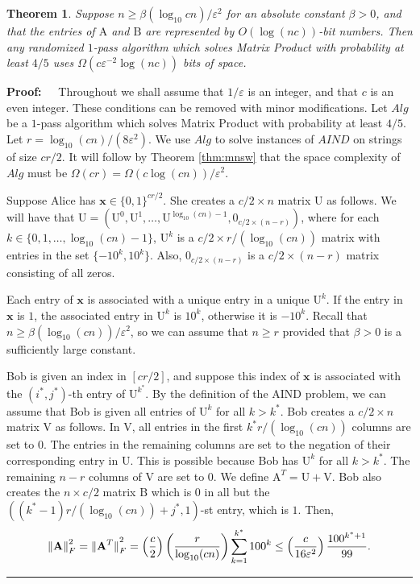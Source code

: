 \documentclass[11pt]{article}
\newtheorem{theorem}{Theorem}
\newenvironment{proof}{\begin{trivlist} \item {\bf Proof:~~}}
  {\qed\end{trivlist}}
\newcommand{\mat}[1]{{\ensuremath{\bm{\mathrm{#1}}}}}
\def\matA{\mat{A}}
\def\matB{\mat{B}}
\def\matU{\mat{U}}
\def\matV{\mat{V}}
\def\frac#1#2{{#1\over #2}}
\def\qed{\hfill\rule{2mm}{2mm}}
\def\x{{\mathbf x}}
\newcommand{\normF}[1]{{\| #1 \|}_F}
\newcommand{\eps}{\varepsilon}
\begin{document}
\begin{theorem}
Suppose $n \geq \beta (\log_{10} cn)/\varepsilon^2$ for an absolute constant $\beta > 0$, and
that the entries of $\matA$ and $\matB$ are represented by $O(\log (nc))$-bit numbers.
Then any randomized $1$-pass algorithm which solves Matrix Product with probability 
at least $4/5$ uses $\Omega(c\varepsilon^{-2}\log (nc))$ bits of space.
\end{theorem}
\begin{proof}
Throughout we shall assume that $1/\eps$ is an integer, and that
$c$ is an even integer. These conditions can be removed with minor modifications.
Let $Alg$ be a $1$-pass algorithm which solves Matrix Product with 
probability at least $4/5$. Let $r = \log_{10} (cn)/(8\varepsilon^2)$. We 
use $Alg$ to solve instances of $AIND$ on strings of size $cr/2$. It will 
follow by Theorem \ref{thm:mnsw} that the space complexity of $Alg$ must be 
$\Omega(cr) = \Omega(c\log (cn))/\eps^2$. 

Suppose Alice has $\x \in \{0,1\}^{cr/2}$. 
She creates a $c/2 \times n$ matrix $\matU$ as follows. We will have that
$\matU = (\matU^0, \matU^1, \ldots, \matU^{\log_{10}(cn) - 1}, \mat0_{c/2 \times (n-r)})$, where for each 
$k \in \{0, 1, \ldots, \log_{10} (cn)-1\}$, $\matU^k$ is a 
$c/2 \times r/(\log_{10} (cn))$ matrix with entries in the set $\{-10^k, 10^k\}$.
Also, $\mat0_{c/2 \times (n-r)}$ is a $c/2 \times (n-r)$ matrix consisting of all zeros.

Each entry of $\x$ is associated with a unique entry in a unique $\matU^k$. If the
entry in $\x$ is $1$, the associated entry in $\matU^k$ is $10^k$, otherwise it is
$-10^k$. Recall that $n \geq \beta (\log_{10}(cn))/\eps^2$, so we can assume 
that $n \geq r$ provided that $\beta > 0$ is a sufficiently large constant.

Bob is given an index in $[cr/2]$, and suppose this index of $\x$ is associated
with the $(i^*, j^*)$-th entry of $\matU^{k^*}$. By the definition of the AIND problem,
we can assume that Bob is given all entries of $\matU^k$ for all $k > k^*$.
Bob creates a $c/2 \times n$ matrix $\matV$ as follows. In $\matV$, all entries in the first
$k^*r/(\log_{10} (cn))$ columns are set to $0$. The entries in the remaining columns
are set to the negation of their corresponding entry in $\matU$. This is possible 
because Bob has $\matU^k$ for all $k > k^*$. 
The remaining $n - r$ columns of 
$\matV$ are set to $0$. We define $\matA^T = \matU + \matV$. Bob also creates the 
$n \times c/2$ matrix $\matB$ which is $0$ in all but the 
$((k^*-1)r/(\log_{10} (cn)) + j^*,1)$-st entry, which is $1$. Then,
$$\normF{\matA}^2 = \normF{\matA^T}^2 = \left (\frac{c}{2} \right ) \left (\frac{r}{\log_{10}(cn)} \right ) \sum_{k=1}^{k^*} 100^k
\leq \left (\frac{c}{16\eps^2} \right ) \frac{100^{k^*+1}}{99}.$$


\end{proof}
\end{document}
